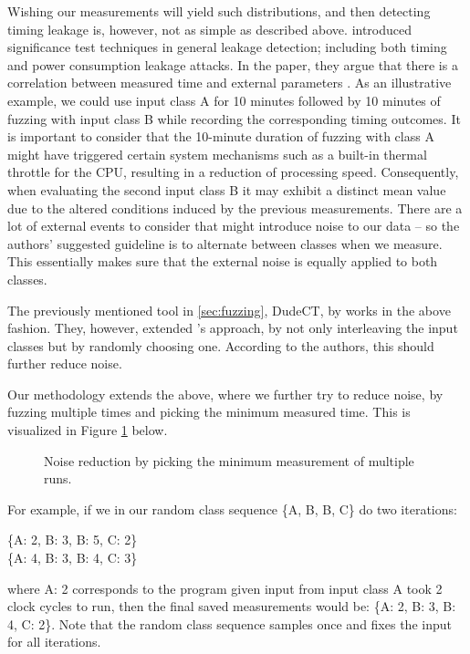 Wishing our measurements will yield such distributions, and then detecting timing leakage is, however, not as simple as described above. \citeauthor{Coron_2004} introduced significance test techniques in general leakage detection; including both timing and power consumption leakage attacks. In the paper, they argue that there is a correlation between measured time and external parameters \citep{Coron_2004}. As an illustrative example, we could use input class A for 10 minutes followed by 10 minutes of fuzzing with input class B while recording the corresponding timing outcomes. It is important to consider that the 10-minute duration of fuzzing with class A might have triggered certain system mechanisms such as a built-in thermal throttle for the CPU, resulting in a reduction of processing speed. Consequently, when evaluating the second input class B it may exhibit a distinct mean value due to the altered conditions induced by the previous measurements. There are a lot of external events to consider that might introduce noise to our data -- so the authors' suggested guideline is to alternate between classes when we measure. This essentially makes sure that the external noise is equally applied to both classes.

The previously mentioned tool in \ref{sec:fuzzing}, DudeCT, by \citeauthor{dudect} works in the above fashion. They, however, extended \citeauthor{Coron_2004}'s approach, by not only interleaving the input classes but by randomly choosing one. According to the authors, this should further reduce noise.

Our methodology extends the above, where we further try to reduce noise, by fuzzing multiple times and picking the minimum measured time. This is visualized in Figure \ref{fig:noisered} below. 
\begin{figure}[H]
    \centering
    
    \caption{Noise reduction by picking the minimum measurement of multiple runs.}
    \label{fig:noisered}
\end{figure}
For example, if we in our random class sequence \{A, B, B, C\} do two iterations:
\begin{center}
    \{A: 2, B: 3, B: 5, C: 2\} \\
    \{A: 4, B: 3, B: 4, C: 3\}
\end{center}
where A: 2 corresponds to the program given input from input class A took 2 clock cycles to run, then the final saved measurements would be: \{A: 2, B: 3, B: 4, C: 2\}. Note that the random class sequence samples once and fixes the input for all iterations.

